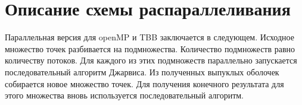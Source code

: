 \documentclass{report}
\begin{document}
\section*{Описание схемы распараллеливания}
\par Параллельная версия для openMP и TBB заключается в следующем. Исходное множество точек разбивается на подмножества. Количество подмножеств равно количеству потоков. Для каждого из этих подмножеств параллельно запускается последовательный алгоритм Джарвиса. Из полученных выпуклых оболочек собирается новое множество точек. Для получения конечного результата для этого множества вновь используется последовательный алгоритм.

\newpage

\end{document}
